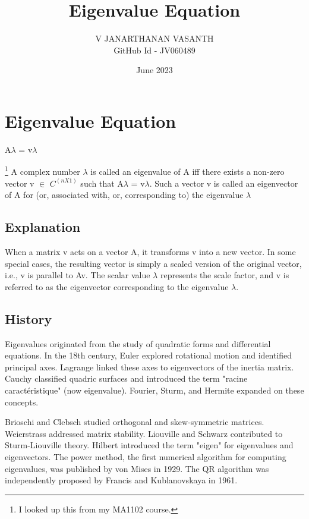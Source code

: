 \documentclass{report}
\begin{document}
\title{Eigenvalue Equation}
\author{V JANARTHANAN VASANTH \\
GitHub Id - JV060489}
\date{June 2023}
\maketitle

\renewcommand{\thesection}{\arabic{section}}
\renewcommand{\thesubsection}{\arabic{section}.\arabic{subsection}}
\section{Eigenvalue Equation}
\centerline{A$\lambda$ = v$\lambda$}\footnote{I looked up this from my MA1102 course.}
A complex number $\lambda$ is called an eigenvalue of A iff there exists a
non-zero vector v $\in$ $C^(nX1)$ such that   A$\lambda$ = v$\lambda$. Such a vector v is called an eigenvector
of A for (or, associated with, or, corresponding to) the eigenvalue $\lambda$


\vspace{\baselineskip}

\subsection{Explanation}

When a matrix v acts on a vector A, it transforms v into a new vector. In some special cases, the resulting vector is simply a scaled version of the original vector, i.e., v is parallel to Av. The scalar value $\lambda$ represents the scale factor, and v is referred to as the eigenvector corresponding to the eigenvalue $\lambda$.


\vspace{\baselineskip}
\subsection{History}
Eigenvalues originated from the study of quadratic forms and differential equations. In the 18th century, Euler explored rotational motion and identified principal axes. Lagrange linked these axes to eigenvectors of the inertia matrix. Cauchy classified quadric surfaces and introduced the term "racine caractéristique" (now eigenvalue). Fourier, Sturm, and Hermite expanded on these concepts.

Brioschi and Clebsch studied orthogonal and skew-symmetric matrices. Weierstrass addressed matrix stability. Liouville and Schwarz contributed to Sturm-Liouville theory. Hilbert introduced the term "eigen" for eigenvalues and eigenvectors. The power method, the first numerical algorithm for computing eigenvalues, was published by von Mises in 1929. The QR algorithm was independently proposed by Francis and Kublanovskaya in 1961.
\end{document}
